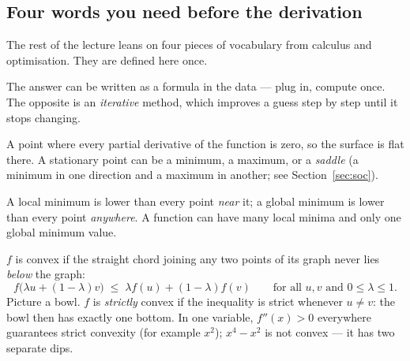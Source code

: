\documentclass[11pt]{article}
\begin{document}
\subsection{Four words you need before the derivation}
\label{sec:words}

The rest of the lecture leans on four pieces of vocabulary from calculus and
optimisation. They are defined here once.

\begin{description}[leftmargin=0pt]
  \item[Closed form.] The answer can be written as a formula in the data ---
    plug in, compute once. The opposite is an \emph{iterative} method, which
    improves a guess step by step until it stops changing.
  \item[Stationary point.] A point where every partial derivative of the
    function is zero, so the surface is flat there. A stationary point can be
    a minimum, a maximum, or a \emph{saddle} (a minimum in one direction and
    a maximum in another; see Section~\ref{sec:soc}).
  \item[Local and global minimum.] A local minimum is lower than every
    point \emph{near} it; a global minimum is lower than every point
    \emph{anywhere}. A function can have many local minima and only one
    global minimum value.
  \item[Convex function.] $f$ is convex if the straight chord joining any
    two points of its graph never lies \emph{below} the graph:
    \[
      f\bigl(\lambda u + (1-\lambda)v\bigr) \;\le\; \lambda f(u) +
        (1-\lambda) f(v)\qquad\text{for all } u, v \text{ and }
        0\le\lambda\le1 .
    \]
    Picture a bowl. $f$ is \emph{strictly} convex if the inequality is strict
    whenever $u \ne v$: the bowl then has exactly one bottom. In one
    variable, $f''(x) > 0$ everywhere guarantees strict convexity (for
    example $x^2$); $x^4 - x^2$ is not convex --- it has two separate
    dips.
\end{description}
\end{document}
